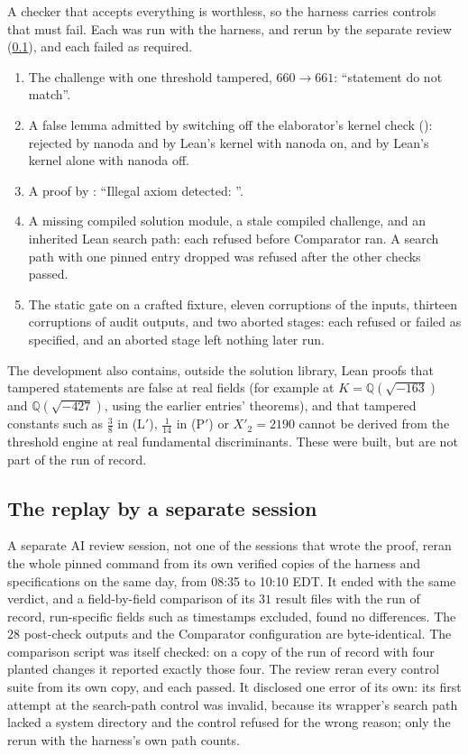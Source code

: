 \documentclass[11pt]{article}
\theoremstyle{definition}
\newcommand{\Q}{\mathbb{Q}}
\begin{document}
A checker that accepts everything is worthless, so the harness carries controls that must fail. Each was run with the harness, and rerun by the separate review (\cref{sec:replay}), and each failed as required.
\begin{enumerate}[label=(\alph*),nosep]
\item The challenge with one threshold tampered, $660 \to 661$: ``statement do not match''.
\item A false lemma admitted by switching off the elaborator's kernel check (): rejected by nanoda and by Lean's kernel with nanoda on, and by Lean's kernel alone with nanoda off.
\item A proof by : ``Illegal axiom detected: ''.
\item A missing compiled solution module, a stale compiled challenge, and an inherited Lean search path: each refused before Comparator ran. A search path with one pinned entry dropped was refused after the other checks passed.
\item The static gate on a crafted fixture, eleven corruptions of the inputs, thirteen corruptions of audit outputs, and two aborted stages: each refused or failed as specified, and an aborted stage left nothing later run.
\end{enumerate}
The development also contains, outside the solution library, Lean proofs that tampered statements are false at real fields (for example at $K = \Q(\sqrt{-163})$ and $\Q(\sqrt{-427})$, using the earlier entries' theorems), and that tampered constants such as $\frac38$ in (L$'$), $\frac1{14}$ in (P$'$) or $X'_2 = 2190$ cannot be derived from the threshold engine at real fundamental discriminants. These were built, but are not part of the run of record.

\subsection{The replay by a separate session}\label{sec:replay}

A separate AI review session, not one of the sessions that wrote the proof, reran the whole pinned command from its own verified copies of the harness and specifications on the same day, from 08:35 to 10:10 EDT. It ended with the same verdict, and a field-by-field comparison of its $31$ result files with the run of record, run-specific fields such as timestamps excluded, found no differences. The $28$ post-check outputs and the Comparator configuration are byte-identical. The comparison script was itself checked: on a copy of the run of record with four planted changes it reported exactly those four. The review reran every control suite from its own copy, and each passed. It disclosed one error of its own: its first attempt at the search-path control was invalid, because its wrapper's search path lacked a system directory and the control refused for the wrong reason; only the rerun with the harness's own path counts.
\end{document}
